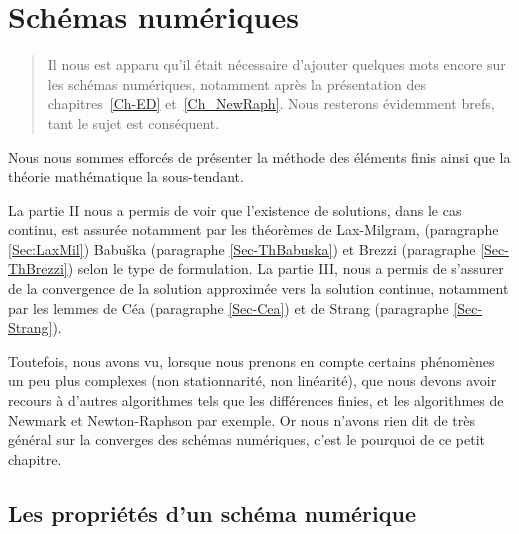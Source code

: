 \chapter{Schémas numériques}\label{Ch-shemanum}
\begin{abstract}
Il nous est apparu qu'il était nécessaire d'ajouter quelques mots encore sur les schémas numériques, notamment après la présentation des chapitres~\ref{Ch-ED} et~\ref{Ch_NewRaph}. Nous resterons évidemment brefs, tant le sujet est conséquent.
\end{abstract}


\medskip
Nous nous sommes efforcés de présenter la méthode des éléments finis ainsi que la théorie mathématique la sous-tendant.

La partie II nous a permis de voir que l'existence de solutions, dans le cas continu, est assurée notamment par les théorèmes de Lax-Milgram, (paragraphe \ref{Sec:LaxMil}) Babuška (paragraphe \ref{Sec-ThBabuska}) et Brezzi\label{Sec:Brezzi} (paragraphe \ref{Sec-ThBrezzi}) selon le type de formulation.
La partie III, nous a permis de s'assurer de la convergence de la solution approximée vers la solution continue, notamment par les lemmes de Céa (paragraphe \ref{Sec-Cea}) et de Strang (paragraphe \ref{Sec-Strang}).

Toutefois, nous avons vu, lorsque nous prenons en compte certains phénomènes un peu plus complexes (non stationnarité, non linéarité), que nous devons avoir recours à d'autres algorithmes tels que les différences finies, et les algorithmes de Newmark et Newton-Raphson par exemple. Or nous n'avons rien dit de très général sur la converges des schémas numériques, c'est le pourquoi de ce petit chapitre.


\medskip
\section{Les propriétés d'un schéma numérique}

\medskip
